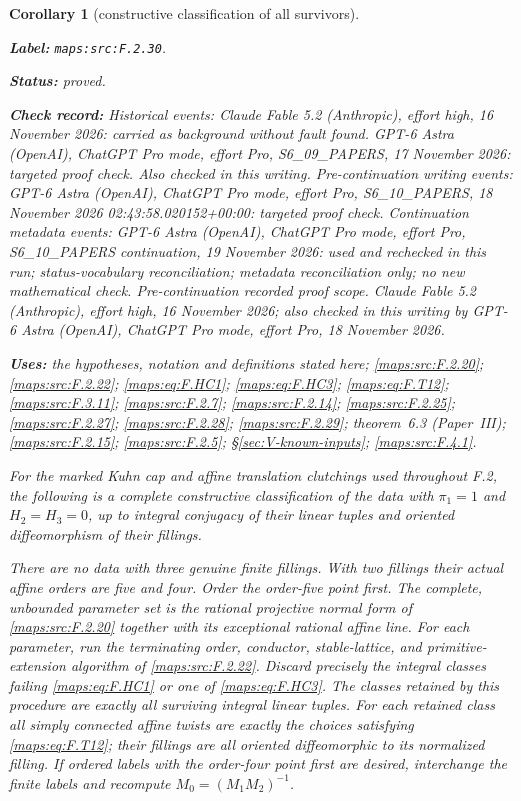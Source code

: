 \documentclass[11pt,a4paper]{article}
\newtheorem{corollary}[corollary]{Corollary}
\theoremstyle{definition}
\newcommand{\StatementRecord}[4]{\par\smallskip\begingroup\upshape\raggedright\noindent\textbf{Label:} \nolinkurl{#1}.\par\noindent\textbf{Status:} #2.\par\noindent\textbf{Check record:} #3.\par\noindent\textbf{Uses:} #4.\par\endgroup\smallskip}
\newcommand{\ExternalPaperRef}[3]{\ifmmode\text{\upshape #1#2 (Paper~#3)}\else #1#2 (Paper~#3)\fi}
\begin{document}
\begin{corollary}[constructive classification of all survivors]\label{maps:src:F.2.30}
\StatementRecord{maps:src:F.2.30}{proved}{Historical events: Claude Fable 5.2 (Anthropic), effort high, 16 November 2026: carried as background without fault found. GPT-6 Astra (OpenAI), ChatGPT Pro mode, effort Pro, S6\_09\_PAPERS, 17 November 2026: targeted proof check. Also checked in this writing. Pre-continuation writing events: GPT-6 Astra (OpenAI), ChatGPT Pro mode, effort Pro, S6\_10\_PAPERS, 18 November 2026 02:43:58.020152+00:00: targeted proof check. Continuation metadata events: GPT-6 Astra (OpenAI), ChatGPT Pro mode, effort Pro, S6\_10\_PAPERS continuation, 19 November 2026: used and rechecked in this run; status-vocabulary reconciliation; metadata reconciliation only; no new mathematical check. \emph{Pre-continuation recorded proof scope.} Claude Fable 5.2 (Anthropic), effort high, 16 November 2026; also checked in this writing by GPT-6 Astra (OpenAI), ChatGPT Pro mode, effort Pro, 18 November 2026}{the hypotheses, notation and definitions stated here; \cref{maps:src:F.2.20}; \cref{maps:src:F.2.22}; \cref{maps:eq:F.HC1}; \cref{maps:eq:F.HC3}; \cref{maps:eq:F.T12}; \cref{maps:src:F.3.11}; \cref{maps:src:F.2.7}; \cref{maps:src:F.2.14}; \cref{maps:src:F.2.25}; \cref{maps:src:F.2.27}; \cref{maps:src:F.2.28}; \cref{maps:src:F.2.29}; \ExternalPaperRef{theorem~}{6.3}{III}; \cref{maps:src:F.2.15}; \cref{maps:src:F.2.5}; \S\ref{sec:V-known-inputs}; \cref{maps:src:F.4.1}}


For the marked Kuhn cap and affine translation clutchings
used throughout F.2, the following is a complete constructive
classification of the data with
$\pi_1=1$ and $H_2=H_3=0$, up to integral conjugacy of their
linear tuples and oriented diffeomorphism of their fillings.

There are no data with three genuine finite fillings.
With two fillings their actual affine orders are five and
four.  Order the order-five point first.
The complete, unbounded parameter set is the rational
projective normal form of \ref{maps:src:F.2.20} together with its
exceptional rational affine line.
For each parameter, run the terminating order,
conductor, stable-lattice, and primitive-extension algorithm
of \ref{maps:src:F.2.22}.  Discard precisely the integral classes failing
\eqref{maps:eq:F.HC1} or one of \eqref{maps:eq:F.HC3}.
The classes retained by this procedure are exactly all
surviving integral linear tuples.
For each retained class all simply connected affine
twists are exactly the choices satisfying \eqref{maps:eq:F.T12};
their fillings are all oriented diffeomorphic to its
normalized filling.
If ordered labels with the order-four point first are
desired, interchange the finite labels and recompute
$M_0=(M_1M_2)^{-1}$.


\end{corollary}
\end{document}
